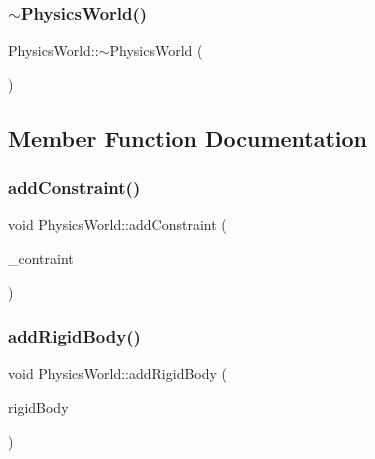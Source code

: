 \mbox{\label{class_physics_world_abf1573b008b52b60a83a8f36cbdd51bc}} 
\subsubsection{\texorpdfstring{$\sim$\+Physics\+World()}{~PhysicsWorld()}}
{\footnotesize\ttfamily Physics\+World\+::$\sim$\+Physics\+World (\begin{DoxyParamCaption}{ }\end{DoxyParamCaption})}



\subsection{Member Function Documentation}
\mbox{\label{class_physics_world_a87bdd79dbd912e814980a9ef2108bfad}} 
\subsubsection{\texorpdfstring{add\+Constraint()}{addConstraint()}}
{\footnotesize\ttfamily void Physics\+World\+::add\+Constraint (\begin{DoxyParamCaption}\item[{std\+::shared\+\_\+ptr$<$ bt\+Hinge\+Constraint $>$}]{\+\_\+contraint }\end{DoxyParamCaption})\hspace{0.3cm}{\ttfamily [inline]}}

\mbox{\label{class_physics_world_aeef0fd2046bc496955484ec95570eb55}} 
\subsubsection{\texorpdfstring{add\+Rigid\+Body()}{addRigidBody()}}
{\footnotesize\ttfamily void Physics\+World\+::add\+Rigid\+Body (\begin{DoxyParamCaption}\item[{std\+::shared\+\_\+ptr$<$ \mbox{\hyperlink{class_rigidbody}{Rigidbody}} $>$ \&}]{rigid\+Body }\end{DoxyParamCaption})\hspace{0.3cm}{\ttfamily [inline]}}

